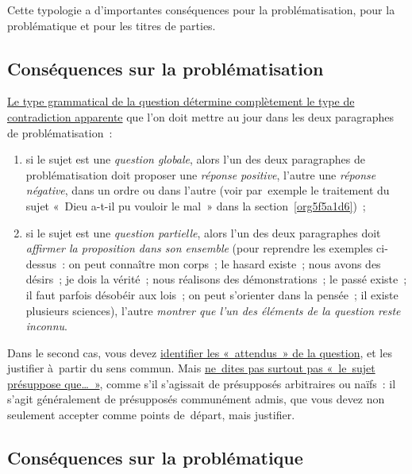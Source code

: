 \documentclass[a4paper,12pt]{report}
\begin{document}
Cette typologie a d'importantes conséquences pour la problématisation,
pour la problématique et pour les titres de parties.


\subsection{Conséquences sur la problématisation}
\label{sec:org4b317a5}

\uline{Le type grammatical de la question détermine complètement le type de
contradiction apparente} que l'on doit mettre au jour dans les deux
paragraphes de problématisation :

\begin{enumerate}
\item si le sujet est une \emph{question globale}, alors l'un des deux
paragraphes de problématisation doit proposer une \emph{réponse positive},
l'autre une \emph{réponse négative}, dans un ordre ou dans l'autre (voir
par exemple le traitement du sujet « Dieu a-t-il pu vouloir le mal »
dans la section \ref{org5f5a1d6}) ;

\item si le sujet est une \emph{question partielle}, alors l'un des deux
paragraphes doit \emph{affirmer la proposition dans son ensemble} (pour
reprendre les exemples ci-dessus : on peut connaître mon corps ; le
hasard existe ; nous avons des désirs ; je dois la vérité ; nous
réalisons des démonstrations ; le passé existe ; il faut parfois
désobéir aux lois ; on peut s'orienter dans la pensée ; il existe
plusieurs sciences), l'autre \emph{montrer que l'un des éléments de la
question reste inconnu}.
\end{enumerate}

Dans le second cas, vous devez \uline{identifier les « attendus » de la
question}, et les justifier à partir du sens commun. Mais \uline{ne dites pas
surtout pas « le sujet présuppose que\ldots{} »}, comme s'il s'agissait de
présupposés arbitraires ou naïfs : il s'agit généralement de présupposés
communément admis, que vous devez non seulement accepter comme points
de départ, mais justifier.


\subsection{Conséquences sur la problématique}
\label{sec:org30fcbfa}
\end{document}
